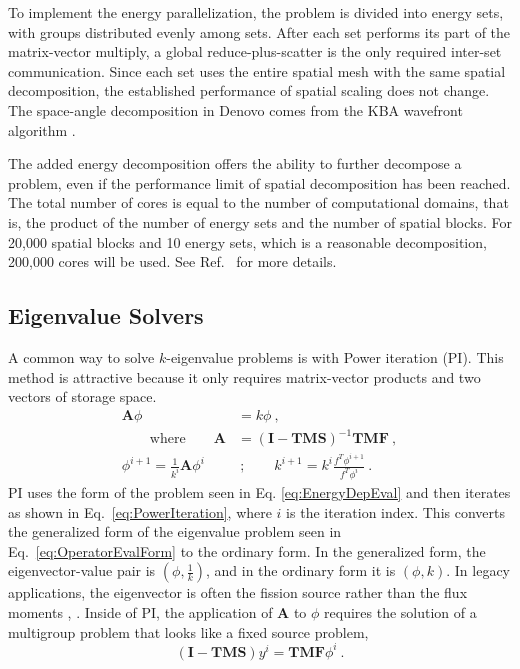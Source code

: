 \documentclass[preprint,12pt]{elsarticle}
\newcommand{\ve}[1]{\ensuremath{\mathbf{#1}}}
\begin{document}
To implement the energy parallelization, the problem is divided into energy sets, with groups distributed evenly among sets. After each set performs its part of the matrix-vector multiply, a global reduce-plus-scatter is the only required inter-set communication. Since each set uses the entire spatial mesh with the same spatial decomposition, the established performance of spatial scaling does not change. The space-angle decomposition in Denovo comes from the KBA wavefront algorithm \cite{Baker1998}. %

The added energy decomposition offers the ability to further decompose a problem, even if the performance limit of spatial decomposition has been reached. The total number of cores is equal to the number of computational domains, that is, the product of the number of energy sets and the number of spatial blocks. For 20,000 spatial blocks and 10 energy sets, which is a reasonable decomposition, 200,000 cores will be used. See Ref.\ \cite{Evans2011} for more details. 

\subsection{Eigenvalue Solvers}
\label{sec:eigenvalue}
A common way to solve $k$-eigenvalue problems is with Power iteration (PI). This method is attractive because it only requires matrix-vector products and two vectors of storage space. 
%
\begin{align}
  \ve{A}\phi &= k\phi \:, \label{eq:EnergyDepEval} \\
  \qquad \text{where}  \qquad \ve{A} &= (\ve{I} - \ve{TMS})^{-1} \ve{TMF} \:, \nonumber \\
  \phi^{i+1} = \frac{1}{k^i}\ve{A}\phi^{i} &\:; \qquad 
  k^{i+1} = k^i \frac{f^T \phi^{i+1}}{f^T \phi^i} \:.
  \label{eq:PowerIteration}
\end{align} 
%
PI uses the form of the problem seen in Eq. \eqref{eq:EnergyDepEval} and then iterates as shown in Eq.\ \eqref{eq:PowerIteration}, where $i$ is the iteration index. This converts the generalized form of the eigenvalue problem seen in Eq.\ \eqref{eq:OperatorEvalForm} to the ordinary form. In the generalized form, the eigenvector-value pair is $(\phi, \frac{1}{k})$, and in the ordinary form it is $(\phi, k)$. 
In legacy applications, the eigenvector is often the fission source rather than the flux moments \cite{Evans2011}, \cite{Lewis1993}.
Inside of PI, the application of $\ve{A}$ to $\phi$ requires the solution of a multigroup problem that looks like a fixed source problem,
\begin{equation}
  (\ve{I} - \ve{TMS})y^{i} = \ve{TMF}\phi^{i} \:. \label{eq:EvalDepFxdSource}
\end{equation}
\end{document}
